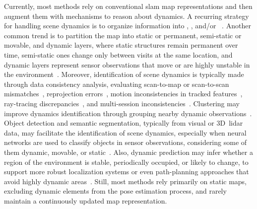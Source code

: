 Currently, most methods rely on conventional \gls{slam} map representations
and then augment them with mechanisms to reason about dynamics.
A recurring strategy for handling scene dynamics is to organize information
into ,
, and/or
~\cite{dayoub:ras:2011,bacca:ras:2013,biber-duckett:ijrr:2009,xing:jfr:2022,biswas-veloso:ras:2017}.
Another common trend is to partition the map into static or permanent,
semi-static or movable, and dynamic layers, where static structures
remain permanent over time, semi-static ones change only between visits
at the same location, and dynamic layers represent sensor observations
that move or are highly unstable in the
environment~\cite{walcott-bryant:iros:2012,zhang:acc:2019,ganti-waslander:crv:2019,zhu:icra:2021,guo-liu:robio:2021,deng:ram:2023,wang:ras:2024,li:tim:2025,bescos:ral:2018,wang:icra:2019,soares:jint:2023}.
Moreover, identification of scene dynamics is typically made through data
consistency analysis, evaluating scan-to-map or scan-to-scan
mismatches~\cite{dayoub:ras:2011,walcott-bryant:iros:2012,saarinen:ijrr:2013,lazaro:iros:2018,boniardi:ras:2019,zhang:acc:2019,kim:icra:2022,deng:ram:2023,stefanini:sensors:2023,hroob:ras:2024,hroob:ral:2024,li:tim:2025,zhu:tim:2025,yang:ral:2024},
reprojection errors~\cite{wu:cvci:2022,liu:scic:2022,du:tvcg:2022,wang:icra:2019,wang:tim:2025},
motion inconsistencies in tracked features~\cite{wang:icra:2019,xing:jfr:2022,liu:scic:2022,cheng:ral:2025,hu:tcsvt:2025,jia:tcsvt:2025,wang:tim:2025},
ray-tracing discrepancies~\cite{biber-duckett:ijrr:2009,saarinen:ijrr:2013,pomerleau:icra:2014,biswas-veloso:ras:2017,lazaro:iros:2018,zhang:acc:2019,ding:tits:2020,thomas:icra:2022,stefanini:sensors:2023},
and multi-session inconsistencies~\cite{ding:tits:2020,kim:icra:2022,yang:ral:2024}.
Clustering may improve dynamics identification through grouping nearby dynamic
observations~\cite{bacca:ras:2013,einhorn-gross:ras:2015,pan:sensors:2019,ding:tits:2020,wang:ras:2024,hu:tcsvt:2025,zhu:tim:2025}.
Object detection and semantic segmentation, typically from visual or
3D~\gls{lidar} data, may facilitate the identification of scene dynamics, especially when neural networks are used to classify objects in sensor
observations, considering some of them dynamic, movable, or
static~\cite{yang:sensors:2020,yue:icra:2020,zhu:icra:2021,xing:jfr:2022,chen:itsc:2022,soares:jint:2023,hu:tcsvt:2025,bescos:ral:2018,wang:icra:2019,ganti-waslander:crv:2019,song:iros:2019,singh:itsc:2021,guo-liu:robio:2021,yu:acait:2023,jia:tcsvt:2025,wang:tim:2025,cheng:ral:2025}.
Also, dynamic prediction may infer whether a region of the environment is
stable, periodically occupied, or likely to change, to support
more robust localization systems or even path-planning approaches that avoid
highly dynamic areas~\cite{tipaldi:ijrr:2013,rapp:itsc:2015,wang:iros:2020,wang:ras:2024,deng:ram:2023,santos:ral:2016,krajnik:tro:2017}.
Still, most methods rely primarily on static maps, excluding dynamic elements
from the pose estimation process, and rarely maintain
a continuously updated map representation.

